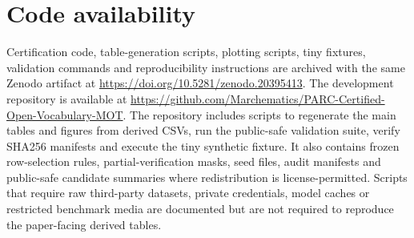 \documentclass[10pt,twocolumn]{article}
\begin{document}
\section*{Code availability}

Certification code, table-generation scripts, plotting scripts, tiny fixtures, validation commands and reproducibility instructions are archived with the same Zenodo artifact at \href{https://doi.org/10.5281/zenodo.20395413}{https://doi.org/10.5281/zenodo.20395413}.
The development repository is available at \href{https://github.com/Marchematics/PARC-Certified-Open-Vocabulary-MOT}{https://github.com/Marchematics/PARC-Certified-Open-Vocabulary-MOT}.
The repository includes scripts to regenerate the main tables and figures from derived CSVs, run the public-safe validation suite, verify SHA256 manifests and execute the tiny synthetic fixture.
It also contains frozen row-selection rules, partial-verification masks, seed files, audit manifests and public-safe candidate summaries where redistribution is license-permitted.
Scripts that require raw third-party datasets, private credentials, model caches or restricted benchmark media are documented but are not required to reproduce the paper-facing derived tables.

{\small


}
\end{document}
